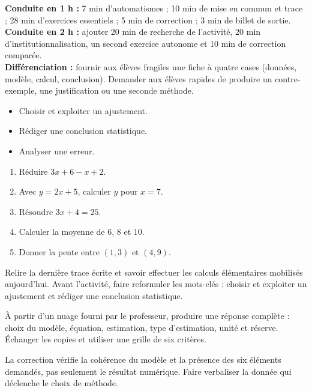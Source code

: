 \ifmxteacher
\begin{method}
\textbf{Conduite en 1 h :} 7 min d'automatismes ; 10 min de mise en commun et trace ; 28 min d'exercices essentiels ; 5 min de correction ; 3 min de billet de sortie.\\
\textbf{Conduite en 2 h :} ajouter 20 min de recherche de l'activité, 20 min d'institutionnalisation, un second exercice autonome et 10 min de correction comparée.\\
\textbf{Différenciation :} fournir aux élèves fragiles une fiche à quatre cases (données, modèle, calcul, conclusion). Demander aux élèves rapides de produire un contre-exemple, une justification ou une seconde méthode.
\end{method}
\fi
{}
\begin{objectives}\begin{itemize}\item Choisir et exploiter un ajustement.\item Rédiger une conclusion statistique.\item Analyser une erreur.\end{itemize}\end{objectives}
\begin{fluency}\begin{enumerate}\item Réduire $3x+6-x+2$. \item Avec $y=2x+5$, calculer $y$ pour $x=7$. \item Résoudre $3x+4=25$. \item Calculer la moyenne de $6$, $8$ et $10$. \item Donner la pente entre $(1,3)$ et $(4,9)$. \end{enumerate}\end{fluency}
\begin{prerequisites}Relire la dernière trace écrite et savoir effectuer les calculs élémentaires mobilisés aujourd'hui. Avant l'activité, faire reformuler les mots-clés : choisir et exploiter un ajustement et rédiger une conclusion statistique.\end{prerequisites}

\begin{activity}
À partir d'un nuage fourni par le professeur, produire une réponse complète : choix du modèle, équation, estimation, type d'estimation, unité et réserve. Échanger les copies et utiliser une grille de six critères.

\end{activity}
\begin{solution}La correction vérifie la cohérence du modèle et la présence des six éléments demandés, pas seulement le résultat numérique. Faire verbaliser la donnée qui déclenche le choix de méthode.\end{solution}


